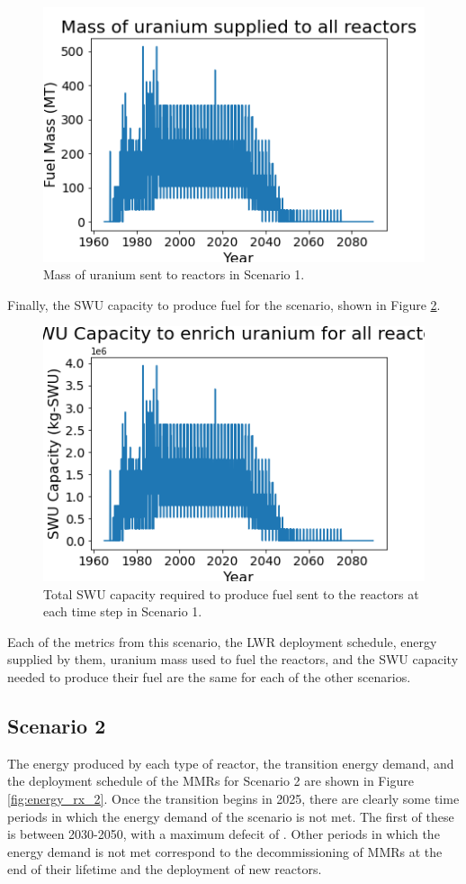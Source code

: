 \begin{figure}
    \centering 
    \includegraphics[scale=0.5]{figures/fuelsupply_scenarios_1.png}
    \caption{Mass of uranium sent to reactors in Scenario 1.}
    \label{fig:fuel_1}
\end{figure}

Finally, the \gls{SWU} capacity to produce fuel for the scenario, shown in 
Figure \ref{fig:swu_1}. 

\begin{figure}
    \centering
    \includegraphics[scale=0.5]{figures/totalswu_scenarios_1.png}
    \caption{Total \gls{SWU} capacity required to produce fuel sent to the 
    reactors at each time step in Scenario 1.}
    \label{fig:swu_1}
\end{figure}


Each of the metrics from this scenario, the \gls{LWR} deployment schedule, 
energy supplied by them, uranium mass used to fuel the reactors, and the 
\gls{SWU} capacity needed to produce their fuel are the same for each of 
the other scenarios. 

\subsection{Scenario 2}
The energy produced by each type of reactor, the transition energy demand, 
and the deployment schedule of the \glspl{MMR} for Scenario 2 are shown in 
Figure \ref{fig:energy_rx_2}. Once the transition begins in 2025, there are 
clearly some time periods in which the energy demand of the scenario is 
not met. The first of these is between 2030-2050, with a maximum defecit 
of . Other periods in which the energy demand is not met correspond to 
the decommissioning of \glspl{MMR} at the end of their lifetime and the 
deployment of new reactors. 

